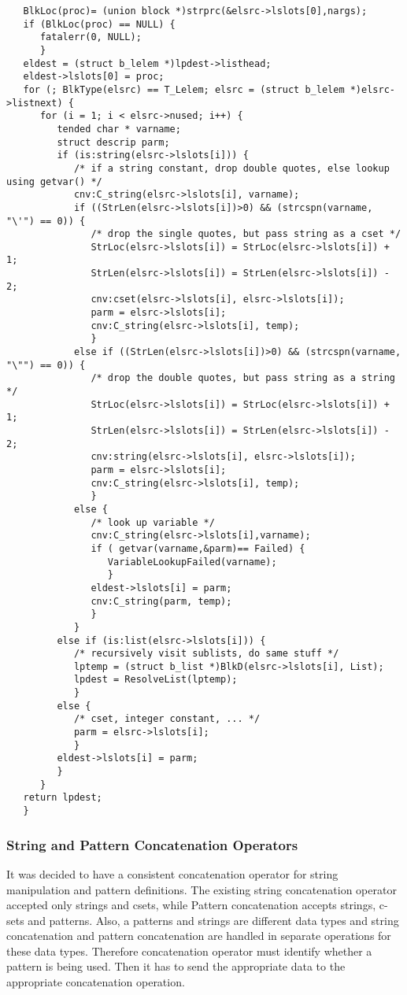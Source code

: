\documentclass{article}
\begin{document}
\begin{verbatim}
   BlkLoc(proc)= (union block *)strprc(&elsrc->lslots[0],nargs);
   if (BlkLoc(proc) == NULL) {
      fatalerr(0, NULL);
      }
   eldest = (struct b_lelem *)lpdest->listhead;
   eldest->lslots[0] = proc;
   for (; BlkType(elsrc) == T_Lelem; elsrc = (struct b_lelem *)elsrc->listnext) {
      for (i = 1; i < elsrc->nused; i++) {
         tended char * varname;
         struct descrip parm;
         if (is:string(elsrc->lslots[i])) {
            /* if a string constant, drop double quotes, else lookup using getvar() */
            cnv:C_string(elsrc->lslots[i], varname);
            if ((StrLen(elsrc->lslots[i])>0) && (strcspn(varname, "\'") == 0)) {
               /* drop the single quotes, but pass string as a cset */
               StrLoc(elsrc->lslots[i]) = StrLoc(elsrc->lslots[i]) + 1;
               StrLen(elsrc->lslots[i]) = StrLen(elsrc->lslots[i]) - 2;
               cnv:cset(elsrc->lslots[i], elsrc->lslots[i]);
               parm = elsrc->lslots[i];
               cnv:C_string(elsrc->lslots[i], temp);
               }
            else if ((StrLen(elsrc->lslots[i])>0) && (strcspn(varname, "\"") == 0)) {
               /* drop the double quotes, but pass string as a string */
               StrLoc(elsrc->lslots[i]) = StrLoc(elsrc->lslots[i]) + 1;
               StrLen(elsrc->lslots[i]) = StrLen(elsrc->lslots[i]) - 2;
               cnv:string(elsrc->lslots[i], elsrc->lslots[i]);
               parm = elsrc->lslots[i];
               cnv:C_string(elsrc->lslots[i], temp);
               }
            else {
               /* look up variable */
               cnv:C_string(elsrc->lslots[i],varname);
               if ( getvar(varname,&parm)== Failed) {
                  VariableLookupFailed(varname);
                  }
               eldest->lslots[i] = parm;
               cnv:C_string(parm, temp);
               }
            }
         else if (is:list(elsrc->lslots[i])) {
            /* recursively visit sublists, do same stuff */
            lptemp = (struct b_list *)BlkD(elsrc->lslots[i], List);
            lpdest = ResolveList(lptemp);
            }
         else { 
            /* cset, integer constant, ... */
            parm = elsrc->lslots[i];
            }
         eldest->lslots[i] = parm;
         }
      }
   return lpdest;
   }
\end{verbatim}

\subsubsection{String and Pattern Concatenation Operators}
It was decided to have a consistent concatenation operator for string manipulation and pattern definitions.  The existing string concatenation operator accepted only strings and csets, while Pattern concatenation accepts strings, c-sets and patterns.  Also, a patterns and strings are different data types and string concatenation and pattern concatenation are handled in separate operations for these data types.  Therefore concatenation operator must identify whether a pattern is being used.  Then it has to send the appropriate data to the appropriate concatenation operation.
\end{document}
